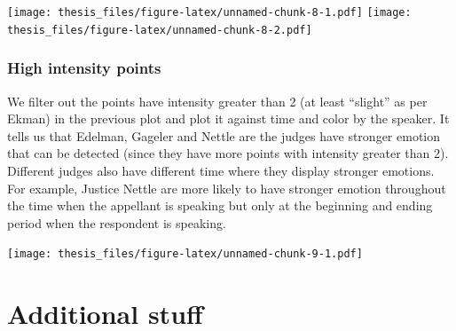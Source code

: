 \documentclass{monashthesis}
\begin{document}
\texttt{[image: thesis\_files/figure-latex/unnamed-chunk-8-1.pdf]} \texttt{[image: thesis\_files/figure-latex/unnamed-chunk-8-2.pdf]}

\hypertarget{high-intensity-points}{%
\subsection{High intensity points}\label{high-intensity-points}}

We filter out the points have intensity greater than 2 (at least ``slight'' as per Ekman) in the previous plot and plot it against time and color by the speaker. It tells us that Edelman, Gageler and Nettle are the judges have stronger emotion that can be detected (since they have more points with intensity greater than 2). Different judges also have different time where they display stronger emotions. For example, Justice Nettle are more likely to have stronger emotion throughout the time when the appellant is speaking but only at the beginning and ending period when the respondent is speaking.

\texttt{[image: thesis\_files/figure-latex/unnamed-chunk-9-1.pdf]}

\appendix

\hypertarget{additional-stuff}{%
\chapter{Additional stuff}\label{additional-stuff}}
\end{document}
